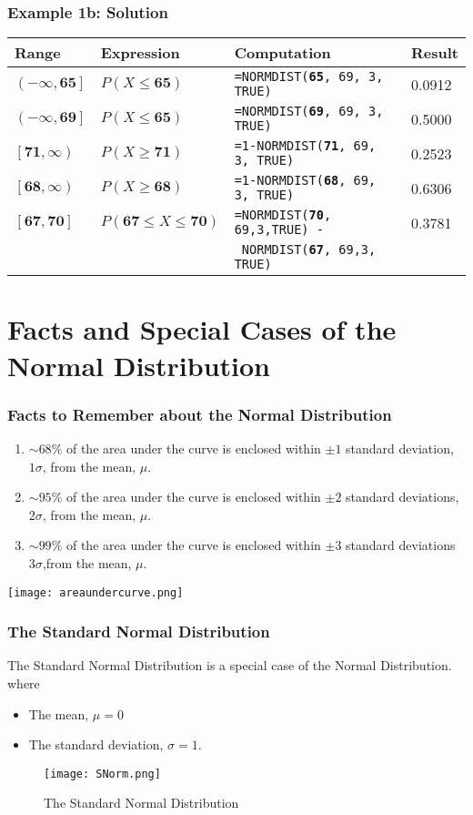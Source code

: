 \documentclass[12pt]{beamer}
\begin{document}
\begin{frame}
	\frametitle{Example 1b: Solution}
	{\footnotesize
		\begin{tabular}{l | l | l| l}
			Range & Expression & Computation & Result \\
			\hline 
			$\left(-\infty,\textbf{65}\right]$  & $P(X \leq \textbf{65})$ & \texttt{=NORMDIST(\textbf{65}, 69, 3, TRUE)} & 0.0912 \\
			$\left(-\infty,\textbf{69}\right]$  & $P(X \leq \textbf{65})$ & \texttt{=NORMDIST(\textbf{69}, 69, 3, TRUE)} & 0.5000 \\
			$\left[\textbf{71}, \infty \right) $ & $P(X\geq\textbf{71})$ & \texttt{=1-NORMDIST(\textbf{71}, 69, 3, TRUE)} &  0.2523\\
			$\left[\textbf{68}, \infty \right) $ & $P(X\geq\textbf{68})$ & \texttt{=1-NORMDIST(\textbf{68}, 69, 3, TRUE)} & 0.6306\\
			$\left[\textbf{67}, \textbf{70}\right]$ &$P(\textbf{67} \leq X \leq \textbf{70})$ & \texttt{=NORMDIST(\textbf{70}, 69,3,TRUE) - }& 0.3781\\
			&&\texttt{  NORMDIST(\textbf{67}, 69,3, TRUE)}&\\
		\end{tabular}
	}
\end{frame}
\section{Facts and Special Cases of the Normal Distribution}
	\begin{frame}
		\frametitle{Facts to Remember about the Normal Distribution}
		\begin{enumerate}
			\item $\sim68\%$ of the area under the curve is enclosed within $\pm1$ standard deviation, $1\sigma$, from the mean, $\mu$.
			\item $\sim95\%$ of the area under the curve is enclosed within $\pm2$ standard deviations, $2\sigma$, from the mean, $\mu$.
			\item $\sim99\%$ of the area under the curve is enclosed within $\pm3$ standard deviations  $3\sigma$,from the mean, $\mu$.
		\end{enumerate}
	\begin{center}
		\texttt{[image: areaundercurve.png]}
	\end{center}
\end{frame}
	
	\begin{frame}
		\frametitle{The Standard Normal Distribution}
		The Standard Normal Distribution is a special case of the Normal Distribution. where
		\begin{itemize}
			\item The mean, $\mu = 0$
			\item The standard deviation, $\sigma =1$.
		\end{itemize}
		\begin{center}
		\begin{figure}
		\texttt{[image: SNorm.png]}
		\caption{The Standard Normal Distribution}
		\end{figure}
	\end{center}
	\end{frame}
\end{document}
